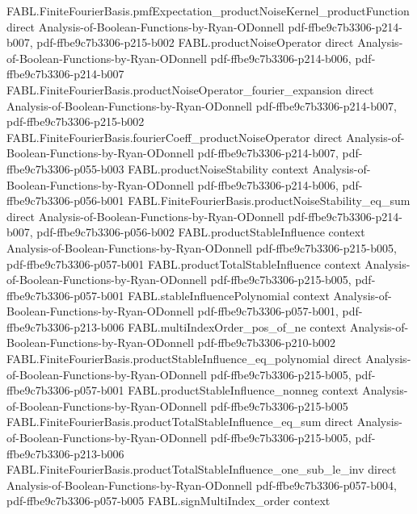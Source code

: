 \begin{theorem}
\proofstep
  {FABL.FiniteFourierBasis.pmfExpectation_productNoiseKernel_productFunction}
  {direct}
  {Analysis-of-Boolean-Functions-by-Ryan-ODonnell}
  {pdf-ffbe9c7b3306-p214-b007,
    pdf-ffbe9c7b3306-p215-b002}
\proofstep
  {FABL.productNoiseOperator}
  {direct}
  {Analysis-of-Boolean-Functions-by-Ryan-ODonnell}
  {pdf-ffbe9c7b3306-p214-b006,
    pdf-ffbe9c7b3306-p214-b007}
\proofstep
  {FABL.FiniteFourierBasis.productNoiseOperator_fourier_expansion}
  {direct}
  {Analysis-of-Boolean-Functions-by-Ryan-ODonnell}
  {pdf-ffbe9c7b3306-p214-b007,
    pdf-ffbe9c7b3306-p215-b002}
\proofstep
  {FABL.FiniteFourierBasis.fourierCoeff_productNoiseOperator}
  {direct}
  {Analysis-of-Boolean-Functions-by-Ryan-ODonnell}
  {pdf-ffbe9c7b3306-p214-b007,
    pdf-ffbe9c7b3306-p055-b003}
\proofstep
  {FABL.productNoiseStability}
  {context}
  {Analysis-of-Boolean-Functions-by-Ryan-ODonnell}
  {pdf-ffbe9c7b3306-p214-b006,
    pdf-ffbe9c7b3306-p056-b001}
\proofstep
  {FABL.FiniteFourierBasis.productNoiseStability_eq_sum}
  {direct}
  {Analysis-of-Boolean-Functions-by-Ryan-ODonnell}
  {pdf-ffbe9c7b3306-p214-b007,
    pdf-ffbe9c7b3306-p056-b002}
\proofstep
  {FABL.productStableInfluence}
  {context}
  {Analysis-of-Boolean-Functions-by-Ryan-ODonnell}
  {pdf-ffbe9c7b3306-p215-b005,
    pdf-ffbe9c7b3306-p057-b001}
\proofstep
  {FABL.productTotalStableInfluence}
  {context}
  {Analysis-of-Boolean-Functions-by-Ryan-ODonnell}
  {pdf-ffbe9c7b3306-p215-b005,
    pdf-ffbe9c7b3306-p057-b001}
\proofstep
  {FABL.stableInfluencePolynomial}
  {context}
  {Analysis-of-Boolean-Functions-by-Ryan-ODonnell}
  {pdf-ffbe9c7b3306-p057-b001,
    pdf-ffbe9c7b3306-p213-b006}
\proofstep
  {FABL.multiIndexOrder_pos_of_ne}
  {context}
  {Analysis-of-Boolean-Functions-by-Ryan-ODonnell}
  {pdf-ffbe9c7b3306-p210-b002}
\proofstep
  {FABL.FiniteFourierBasis.productStableInfluence_eq_polynomial}
  {direct}
  {Analysis-of-Boolean-Functions-by-Ryan-ODonnell}
  {pdf-ffbe9c7b3306-p215-b005,
    pdf-ffbe9c7b3306-p057-b001}
\proofstep
  {FABL.productStableInfluence_nonneg}
  {context}
  {Analysis-of-Boolean-Functions-by-Ryan-ODonnell}
  {pdf-ffbe9c7b3306-p215-b005}
\proofstep
  {FABL.FiniteFourierBasis.productTotalStableInfluence_eq_sum}
  {direct}
  {Analysis-of-Boolean-Functions-by-Ryan-ODonnell}
  {pdf-ffbe9c7b3306-p215-b005,
    pdf-ffbe9c7b3306-p213-b006}
\proofstep
  {FABL.FiniteFourierBasis.productTotalStableInfluence_one_sub_le_inv}
  {direct}
  {Analysis-of-Boolean-Functions-by-Ryan-ODonnell}
  {pdf-ffbe9c7b3306-p057-b004,
    pdf-ffbe9c7b3306-p057-b005}
\proofstep
  {FABL.signMultiIndex_order}
  {context}

\end{theorem}
